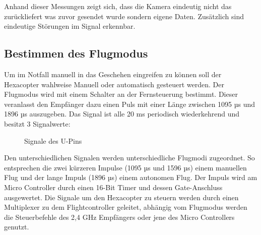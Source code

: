 Anhand dieser Messungen zeigt sich, dass die Kamera eindeutig nicht das zurückliefert was zuvor gesendet wurde sondern eigene Daten. Zusätzlich sind eindeutige Störungen im Signal erkennbar.

\subsection{Bestimmen des Flugmodus}
Um im Notfall manuell in das Geschehen eingreifen zu können soll der Hexacopter wahlweise Manuell oder automatisch gesteuert werden.
Der Flugmodus wird mit einem Schalter an der Fernsteuerung bestimmt. Dieser veranlasst den Empfänger dazu einen Puls mit einer Länge zwischen 1095 µs und 1896 µs auszugeben. Das Signal ist alle 20 ms periodisch wiederkehrend und besitzt 3 Signalwerte:

\begin{figure}[tbh]
\caption{Signale des U-Pins}
\label{U-Signale}
\end{figure}
Den unterschiedlichen Signalen werden unterschiedliche Flugmodi zugeordnet. So entsprechen die zwei kürzeren Impulse (1095 µs und 1596 µs) einem manuellen Flug und der lange Impuls (1896 µs) einem autonomen Flug.
Der Impuls wird am Micro Controller durch einen 16-Bit Timer und dessen Gate-Anschluss ausgewertet.
Die Signale um den Hexacopter zu steuern werden durch einen Multiplexer zu dem Flightcontroller geleitet, abhängig vom Flugmodus werden die Steuerbefehle des 2,4 GHz Empfängers oder jene des Micro Controllers genutzt.

